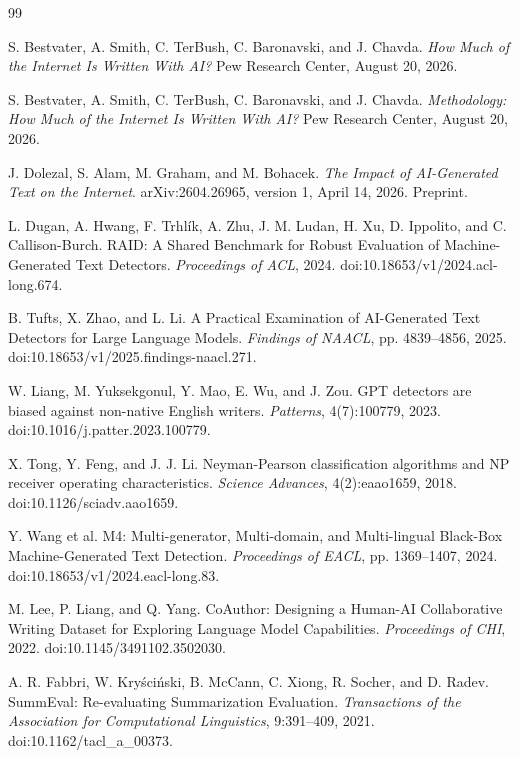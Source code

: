 \documentclass[11pt]{article}
\begin{document}
\begin{thebibliography}{99}
\raggedright
{}
S. Bestvater, A. Smith, C. TerBush, C. Baronavski, and J. Chavda.
\emph{How Much of the Internet Is Written With AI?}
Pew Research Center, August 20, 2026.

S. Bestvater, A. Smith, C. TerBush, C. Baronavski, and J. Chavda.
\emph{Methodology: How Much of the Internet Is Written With AI?}
Pew Research Center, August 20, 2026.

J. Dolezal, S. Alam, M. Graham, and M. Bohacek.
\emph{The Impact of AI-Generated Text on the Internet}.
arXiv:2604.26965, version 1, April 14, 2026. Preprint.

L. Dugan, A. Hwang, F. Trhl\'{i}k, A. Zhu, J. M. Ludan, H. Xu,
D. Ippolito, and C. Callison-Burch.
RAID: A Shared Benchmark for Robust Evaluation of Machine-Generated Text
Detectors. \emph{Proceedings of ACL}, 2024.
doi:10.18653/v1/2024.acl-long.674.

B. Tufts, X. Zhao, and L. Li.
A Practical Examination of AI-Generated Text Detectors for Large Language
Models. \emph{Findings of NAACL}, pp. 4839--4856, 2025.
doi:10.18653/v1/2025.findings-naacl.271.

W. Liang, M. Yuksekgonul, Y. Mao, E. Wu, and J. Zou.
GPT detectors are biased against non-native English writers.
\emph{Patterns}, 4(7):100779, 2023.
doi:10.1016/j.patter.2023.100779.

X. Tong, Y. Feng, and J. J. Li.
Neyman-Pearson classification algorithms and NP receiver operating characteristics.
\emph{Science Advances}, 4(2):eaao1659, 2018.
doi:10.1126/sciadv.aao1659.

Y. Wang et al.
M4: Multi-generator, Multi-domain, and Multi-lingual Black-Box Machine-Generated
Text Detection. \emph{Proceedings of EACL}, pp. 1369--1407, 2024.
doi:10.18653/v1/2024.eacl-long.83.

M. Lee, P. Liang, and Q. Yang.
CoAuthor: Designing a Human-AI Collaborative Writing Dataset for Exploring
Language Model Capabilities. \emph{Proceedings of CHI}, 2022.
doi:10.1145/3491102.3502030.

A. R. Fabbri, W. Kry\'{s}ci\'{n}ski, B. McCann, C. Xiong, R. Socher, and D. Radev.
SummEval: Re-evaluating Summarization Evaluation.
\emph{Transactions of the Association for Computational Linguistics}, 9:391--409,
2021. doi:10.1162/tacl\_a\_00373.
\end{thebibliography}
\end{document}
